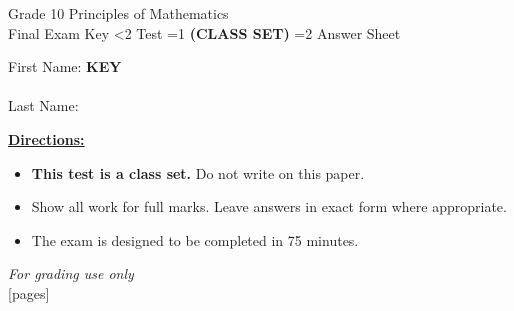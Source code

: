 \documentclass[addpoints]{exam}
\newcommand{\event}{Final Exam}
\newcommand{\tournament}{}
\def\type{0}
\begin{document}
\begin{center}
    {\huge Grade 10 Principles of Mathematics \\ \event
    \ifprintanswers \space Key
    \else \space \ifnum\type<2 Test \fi \ifnum\type=1 \textbf{(CLASS SET)} \fi
          \ifnum\type=2 Answer Sheet \fi
    \fi \\ \vspace{3mm}\tournament\vspace{1mm}}
\end{center}

\vspace{.25\textheight}

\begin{center}
    First Name: \ifprintanswers
    \underline{\hspace{3.5cm}}\textbf{KEY}\underline{\hspace{5.5cm}}\\\vspace{5mm}
    \else \underline{\hspace{10cm}}\\ \vspace{5mm} \fi
    Last Name: \underline{\hspace{10cm}}\\ \vspace{5mm}
\end{center}

\noindent\textbf{\underline{Directions:}}
\begin{itemize}
    \ifnum\type=1 \item \textbf{This test is a class set.} Do not write on this paper. \fi
    \item Show all work for full marks. Leave answers in exact form where appropriate.
    \item The exam is designed to be completed in 75 minutes.
\end{itemize}
\begin{center}
\textit{For grading use only}\\
[pages]
\end{center}
\end{document}
